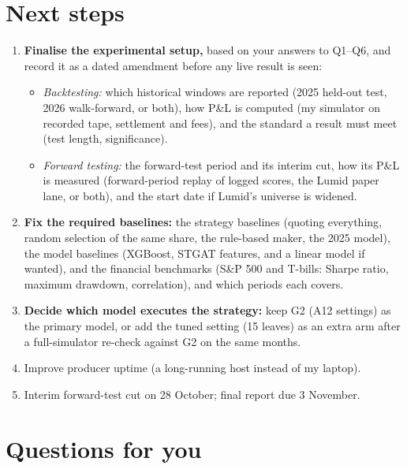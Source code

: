 \documentclass[11pt,a4paper]{article}
\begin{document}
\section{Next steps}
\begin{enumerate}
  \item \textbf{Finalise the experimental setup,} based on your answers to Q1--Q6, and record it as a dated
        amendment before any live result is seen:
        \begin{itemize}
          \item \emph{Backtesting:} which historical windows are reported (2025 held-out test, 2026 walk-forward,
                or both), how P\&L is computed (my simulator on recorded tape, settlement and fees), and the
                standard a result must meet (test length, significance).
          \item \emph{Forward testing:} the forward-test period and its interim cut, how its P\&L is measured
                (forward-period replay of logged scores, the Lumid paper lane, or both), and the start date if
                Lumid's universe is widened.
        \end{itemize}
  \item \textbf{Fix the required baselines:} the strategy baselines (quoting everything, random selection of the
        same share, the rule-based maker, the 2025 model), the model baselines (XGBoost, STGAT features, and a
        linear model if wanted), and the financial benchmarks (S\&P 500 and T-bills: Sharpe ratio, maximum
        drawdown, correlation), and which periods each covers.
  \item \textbf{Decide which model executes the strategy:} keep G2 (A12 settings) as the primary model, or add the
        tuned setting (15 leaves) as an extra arm after a full-simulator re-check against G2 on the same months.
  \item Improve producer uptime (a long-running host instead of my laptop).
  \item Interim forward-test cut on 28 October; final report due 3 November.
\end{enumerate}

\section{Questions for you}\label{sec:questions}
\end{document}
